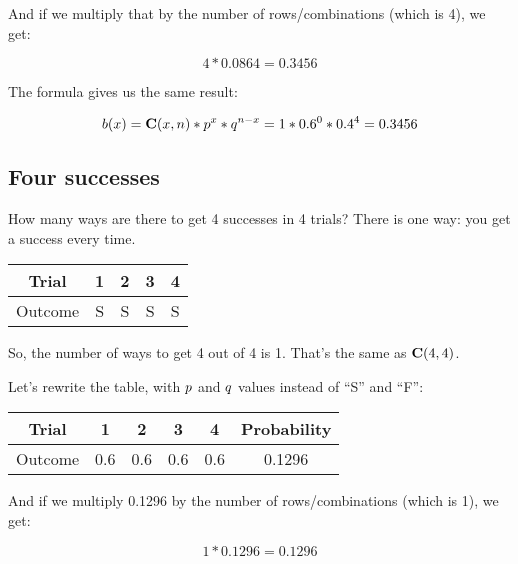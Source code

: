 \documentclass[../../../main.tex]{subfiles}
\begin{document}
\noindent
And if we multiply that by the number of rows/combinations (which is 4), we get:

\begin{equation*}
    4 * 0.0864 = 0.3456
\end{equation*}

\noindent
The formula gives us the same result:

\begin{equation*}
  \Binom{\RandVarVal/} = \combs{\RandVarVal/}{n} * p^{\RandVarVal/} * q^{n - \RandVarVal/} = 1 * 0.6^{0} * 0.4^{4} = 0.3456
\end{equation*}


\subsection{Four successes}

How many ways are there to get 4 successes in 4 trials? There is one way: you get a success every time.

\begin{center}
  \begin{tabular}{| c | c | c | c | c |}
    \hline
    \textbf{Trial} & \textbf{1} & \textbf{2} & \textbf{3} & \textbf{4} \\ \hline
  Outcome & S & S & S & S \\ \hline
  \end{tabular}
\end{center}

\noindent
So, the number of ways to get 4 out of 4 is 1. That's the same as $\mathbf{C}(4, 4)$. 

Let's rewrite the table, with $\success/$ and $\failure/$ values instead of ``S'' and ``F'':

\begin{center}
  \begin{tabular}{| c | c | c | c | c | c |}
    \hline
    \textbf{Trial} & \textbf{1} & \textbf{2} & \textbf{3} & \textbf{4} & \textbf{Probability} \\ \hline
  Outcome & 0.6 & 0.6 & 0.6 & 0.6 & 0.1296 \\ \hline
  \end{tabular}
\end{center}

\noindent
And if we multiply 0.1296 by the number of rows/combinations (which is 1), we get:

\begin{equation*}
    1 * 0.1296 = 0.1296
\end{equation*}
\end{document}

